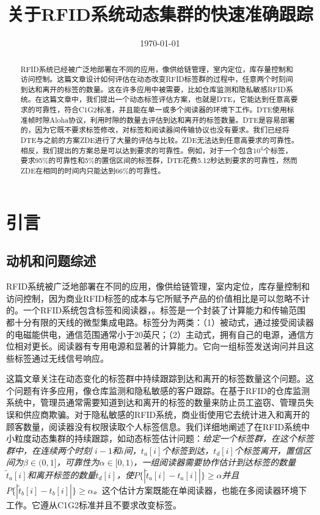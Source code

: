 \documentclass[UTF8]{ctexart}
\title{关于RFID系统动态集群的快速准确跟踪}
\date{\today}
\begin{document}
\maketitle
\begin{abstract}
RFID系统已经被广泛地部署在不同的应用，像供给链管理，室内定位，库存量控制和访问控制。这篇文章设计如何评估在动态改变RFID标签群的过程中，任意两个时刻间到达和离开的标签的数量。这在许多应用中被需要，比如仓库监测和隐私敏感RFID系统。在这篇文章中，我们提出一个动态标签评估方案，也就是DTE，它能达到任意高要求的可靠性，符合C1G2标准，并且能在单一或多个阅读器的环境下工作。DTE使用标准帧时隙Aloha协议，利用时隙的数量去评估到达和离开的标签数量。DTE是容易部署的，因为它既不要求标签修改，对标签和阅读器间传输协议也没有要求。我们已经将DTE与之前的方案ZDE进行了大量的评估与比较。Z\-DE无法达到任意高要求的可靠性。相反，我们提出的方案总是可以达到要求的可靠性。例如，对于一个包含$10^4$个标签，要求95\%的可靠性和5\%的置信区间的标签群，DTE花费5.12秒达到要求的可靠性，然而ZDE在相同的时间内只能达到66\%的可靠性。
\end{abstract}
\section{引言}
\subsection{动机和问题综述}
RFID系统被广泛地部署在不同的应用，像供给链管理，室内定位，库存量控制和访问控制，因为商业RFID标签的成本与它所赋予产品的价值相比是可以忽略不计的。一个RFID系统包含标签和阅读器，。标签是一个封装了计算能力和传输范围都十分有限的天线的微型集成电路。标签分为两类：（1）被动式，通过接受阅读器的电磁能供电，通信范围通常小于20英尺；（2）主动式，拥有自己的电源，通信方位相对更长。阅读器有专用电源和显著的计算能力。它向一组标签发送询问并且这些标签通过无线信号响应。

这篇文章关注在动态变化的标签群中持续跟踪到达和离开的标签数量这个问题。这个问题有许多应用，像仓库监测和隐私敏感的客户跟踪。在基于RFID的仓库监测系统中，管理员通常需要知道到达和离开的标签的数量来防止员工盗窃、管理员失误和供应商欺骗。对于隐私敏感的RFID系统，商业街使用它去统计进入和离开的顾客数量，阅读器没有权限读取个人标签信息。我们详细地阐述了在RFID系统中小粒度动态集群的持续跟踪，如动态标签估计问题：\emph{给定一个标签群，在这个标签群中，在连续两个时刻 $i-1$和$i$间，$t_a[i]$个标签到达，$t_d[i]$个标签离开，置信区间为$\beta\in(0, 1]$，可靠性为$\alpha\in[0, 1)$，一组阅读器需要协作估计到达标签的数量$\widetilde{t}_a[i]$和离开标签的数量$\widetilde{t}_d[i]$，使$P\{|\widetilde{t}_a[i]-t_a[i]|\}\geq\alpha$并且$P\{|\widetilde{t}_b[i]-t_b[i]|\}\geq\alpha$。}这个估计方案既能在单阅读器，也能在多阅读器环境下工作。它遵从C1G2标准并且不要求改变标签。
\end{document}

